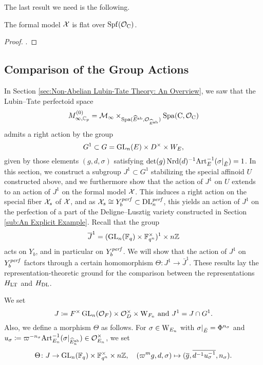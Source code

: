 \documentclass[../main.tex]{subfiles}
\begin{document}
The last result we need is the following.
\begin{prop}\label{prop:FlatnessOfFormalModel}
  The formal model $\mathcal{X}$ is flat over $\operatorname{Spf}(\mathcal{O}_{\mathrm{C}})$. 
\begin{proof}
  .
\end{proof}
\end{prop}



\subsection{Comparison of the Group Actions} %
\label{sub:Proof of Proposition}
In Section \ref{sec:Non-Abelian Lubin-Tate Theory: An Overview}, we saw that
the Lubin--Tate perfectoid space 
$$M_{\infty, \mathbb{C}_p}^{(0)} = \mathcal{M}_{\infty} \times_{\operatorname{Spa}(\widehat E^{\mathrm{ab}}, \mathcal{O}_{\widehat
E^{\mathrm{ab}}})} \operatorname{Spa}({\mathrm{C}}, \mathcal{O}_{\mathrm{C}})$$ 
admits a right action by the group
\begin{equation*}
  G^1 \subset G = \operatorname{GL}_n(E) \times D^\times \times W_E,
\end{equation*}
given by those elements $(g,d,\sigma)$ satisfying $\det(g) \operatorname{Nrd}(d)^{-1} \mathrm{Art}_E^{-1}(\sigma|_{\breve {E}}) = 1$.
In this section, we construct a subgroup $J^1 \subset G^1$ stabilizing the
special affinoid $U$ constructed above, and we furthermore show that 
the action of $J^1$ on $U$ extends to an action of $J^1$ on the formal model
$\mathcal{X}$. This induces a right action on the special fiber
$\mathcal{X}_s$ of $\mathcal{X}$, and as $\mathcal{X}_s \cong Y_b^{\mathit{perf}} \subset \mathrm{DL}_n^{\mathit{perf}}$, this
yields an action of $J^1$ on the perfection of a part of the Deligne--Lusztig
variety constructed in Section \ref{sub:An Explicit Example}. Recall that the group 
\begin{equation*}
  \overline J^1 = (\operatorname{GL}_n(\mathbb{F}_q) \times \mathbb{F}_{q^n}^\times)^1 \times n\mathbb{Z}
\end{equation*}
acts on $Y_b$, and in particular on 
$Y_b^{\mathit{perf}}$. We will show that the action of $J^1$ on $Y_b^{\mathit{perf}}$
factors through a certain homomorphism $\Theta: J^1 \to \bar J^1$. These
results lay the representation-theoretic ground for the comparison between the
representations $H_{\mathrm{LT}}$ and $H_\mathrm{DL}$.

We set 
\begin{equation} \label{eq:defJandJ1}
  J \coloneqq F^\times \operatorname{GL}_n(\mathcal{O}_F) \times \mathcal{O}_D^\times \times \mathrm W_{F_n}
  \text{ and } J^1 = J \cap G^1.
\end{equation}
Also, we define a morphism $\Theta$ as follows. For $\sigma \in \mathrm W_{E_n}$ with
$\sigma|_{\breve {E}} = \Phi^{n_\sigma}$ and $u_\sigma \coloneq \varpi^{-n_\sigma}
\mathrm{Art}^{-1}_{E_n}(\sigma|_{\widehat E_n^{\mathrm{ab}}}) \in \mathcal{O}_{E_n}^\times$, we set
\begin{equation*}
  \Theta \colon J \to \operatorname{GL}_n(\mathbb{F}_q) \times \mathbb{F}_{q^n}^\times \times {n\mathbb{Z}}, \quad
  (\varpi^m g,d,\sigma) \mapsto (\overline g, \overline {d^{-1}u_\sigma^{-1}}, n_\sigma).
\end{equation*}
\end{document}
